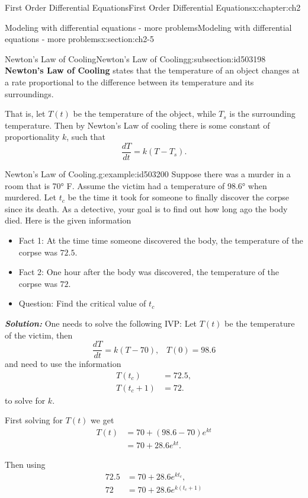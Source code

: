 \documentclass[oneside,10pt,]{book}
\newcommand{\alert}[1]{\textbf{\textit{#1}}}
\newcommand{\terminology}[1]{\textbf{#1}}
\numberwithin{equation}{section}
\numberwithin{equation}{section}
\newcommand{\amp}{&}
\begin{document}
\begin{chapterptx}{First Order Differential Equations}{}{First Order Differential Equations}{}{}{x:chapter:ch2}
\begin{sectionptx}{Modeling with differential equations - more problems}{}{Modeling with differential equations - more problems}{}{}{x:section:ch2-5}
\begin{subsectionptx}{Newton's Law of Cooling}{}{Newton's Law of Cooling}{}{}{g:subsection:id503198}
\terminology{Newton's Law of Cooling} states that the temperature of an object changes at a rate proportional to the difference between its temperature and its surroundings.%
\par
That is, let \(T(t)\) be the temperature of the object, while \(T_{s}\) is the surrounding temperature. Then by Newton's Law of cooling there is some constant of proportionality \(k\), such that%
\begin{equation*}
\frac{dT}{dt}=k\left(T-T_{s}\right).
\end{equation*}
%
\begin{example}{Newton's Law of Cooling.}{g:example:id503200}%
Suppose there was a murder in a room that is 70° F. Assume the victim had a temperature of 98.6° when murdered. Let \(t_{c}\) be the time it took for someone to finally discover the corpse since its death. As a detective, your goal is to find out how long ago the body died. Here is the given information %
\begin{itemize}[label=\textbullet]
\item{}Fact 1: At the time time someone discovered the body, the temperature of the corpse was \(72.5\).%
\item{}Fact 2: One hour after the body was discovered, the temperature of the corpse was \(72\).%
\item{}Question: Find the critical value of \(t_{c}\)%
\end{itemize}
\alert{Solution:} One needs to solve the following IVP: Let \(T(t)\) be the temperature of the victim, then%
\begin{equation*}
\frac{dT}{dt}=k\left(T-70\right),\,\,\,\,\,T\left(0\right)=98.6
\end{equation*}
and need to use the information%
\begin{align*}
T(t_{c}) \amp =72.5,\\
T(t_{c}+1) \amp =72.
\end{align*}
to solve for \(k\).%
\par
First solving for \(T(t)\) we get%
\begin{align*}
T(t) \amp =70+\left(98.6-70\right)e^{kt}\\
\amp =70+28.6e^{kt}.
\end{align*}
%
\par
Then using%
\begin{align*}
72.5 \amp =70+28.6e^{kt_{c}},\\
72 \amp =70+28.6e^{k(t_{c}+1)}
\end{align*}
%
\par

\end{example}
\end{subsectionptx}
\end{sectionptx}
\end{chapterptx}
\end{document}
